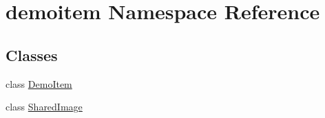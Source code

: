\hypertarget{namespacedemoitem}{}\section{demoitem Namespace Reference}
\label{namespacedemoitem}
\subsection*{Classes}
\begin{DoxyCompactItemize}
\item 
class \hyperlink{classdemoitem_1_1DemoItem}{Demo\+Item}
\item 
class \hyperlink{classdemoitem_1_1SharedImage}{Shared\+Image}
\end{DoxyCompactItemize}
